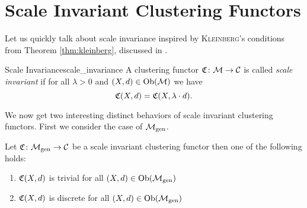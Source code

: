\section{Scale Invariant Clustering Functors}
Let us quickly talk about scale invariance inspired by \textsc{Kleinberg}'s conditions from Theorem \ref{thm:kleinberg}, discussed in \cite[Sec.~6.6]{Carlsson2010}.

\begin{definition}{Scale Invariance}{scale_invariance}
    A clustering functor $\mathfrak{C}\colon \mathcal{M} \to \mathcal{C}$ is called \emph{scale invariant} if for all $\lambda > 0$ and $(X,d) \in \mathrm {Ob}(\mathcal{M})$ we have
    \begin{equation*}
        \mathfrak{C}(X,d) = \mathfrak{C}(X,\lambda \cdot d).
    \end{equation*}
\end{definition}

We now get two interesting distinct behaviors of scale invariant clustering functors. First we consider the case of ${\mathcal{M}_\mathrm{gen}}$.

\begin{proposition}{\cite[Thm.~6.5]{Carlsson2010}}{}
    Let $\mathfrak{C}\colon {\mathcal{M}_\mathrm{gen}} \to \mathcal{C}$ be a scale invariant clustering functor then one of the following holds:
    \begin{enumerate}
        \item $\mathfrak{C}(X,d)$ is trivial for all $(X,d) \in \mathrm {Ob}({\mathcal{M}_\mathrm{gen}})$
        \item $\mathfrak{C}(X,d)$ is discrete for all $(X,d) \in \mathrm {Ob}({\mathcal{M}_\mathrm{gen}})$
    \end{enumerate}
\end{proposition}

